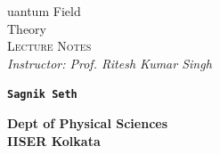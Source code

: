 \documentclass[usenames, svgnames, dvipsnames]{scrartcl}
\begin{document}
\makeatletter
\begin{titlepage}
    \vspace*{2cm}
    
        \begin{center}
            {\rmfamily
                \Huge{\textcolor{blue!30!black}{%
                    \textmd{{}}uantum {\HUGE F}ield \\
                     {\HUGE T}heory%
                }}\\[0.7cm]
                
                
                \Large \textsc{Lecture Notes} \\[0.3cm]
               \Large \textit{Instructor: Prof. Ritesh Kumar Singh }\\[0.7cm]

            }
            \end{center}
       
        \begin{figure}[H]
            \centering
           
        \end{figure}
        \vspace{1cm}
        \begin{center}
           \Large \texttt{\textbf{{\LARGE  S}agnik {\LARGE S}eth }}
        \end{center}
        \vspace{0.5cm}
      \begin{center}
    \textbf{ Dept of Physical Sciences} \\
    \textbf{IISER Kolkata}
    \vspace{0.5cm}

   
\end{center}

\end{titlepage}
\end{document}
